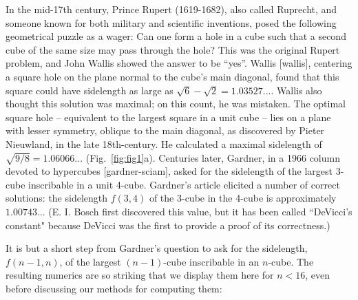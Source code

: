 \documentclass[superscriptaddress,reprint,amsmath,amssymb,aps]{revtex4-1}
\begin{document}
\vspace{.15in}

In the mid-17th century, Prince Rupert (1619-1682), also called Ruprecht, and someone known for both military and scientific inventions, posed the following geometrical puzzle as a wager: Can one form a hole in a cube such that a second cube of the same size may pass through the hole?
This was the original Rupert problem, and John Wallis showed the answer to be ``yes''.  Wallis [wallis], centering a square hole on the plane normal to the cube's main diagonal, found that this square could have sidelength as large as $\sqrt{6}-\sqrt{2}=1.03527...$.  Wallis also thought this solution was maximal; on this count, he was mistaken.  The optimal square hole -- equivalent to the largest square in a unit cube -- lies on a plane with lesser symmetry, oblique to the main diagonal, as discovered by Pieter Nieuwland, in the late 18th-century.  He calculated a maximal sidelength of $\sqrt{9/8} = 1.06066...$ (Fig.~\ref{fig:fig1}a). Centuries later, Gardner, in a 1966 column devoted to hypercubes [gardner-sciam], asked for the sidelength of the largest 3-cube inscribable in a unit 4-cube. Gardner's article elicited a number of correct solutions: the sidelength $f(3,4)$ of the 3-cube in the 4-cube is approximately $1.00743...$ (E. I. Bosch first discovered this value, but it has been called ``DeVicci's constant" \cite{finch} because DeVicci was the first to provide a proof of its correctness\cite{devicci-shultz}.)

\vspace{.15in}

It is but a short step from Gardner's question to ask for the sidelength, $f(n-1,n)$, of the largest $(n-1)$-cube inscribable in an $n$-cube.  The resulting numerics are so striking that we display them here for $n<16$, even before discussing our methods for computing them:
\end{document}
